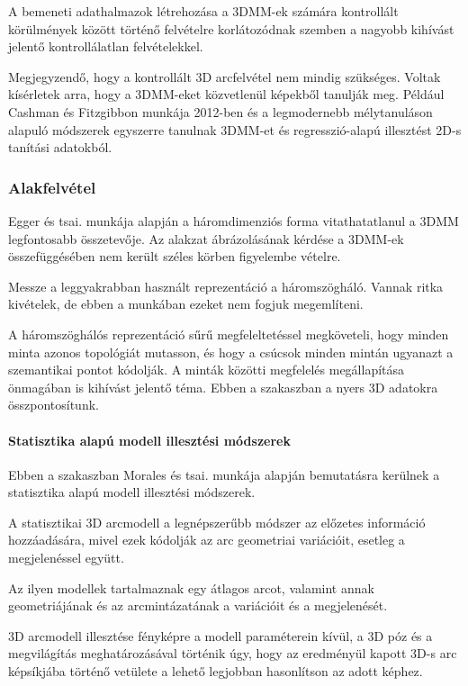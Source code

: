 \documentclass[12pt,a4]{article}
\begin{document}
        A bemeneti adathalmazok létrehozása a 3DMM-ek számára kontrollált körülmények között történő felvételre korlátozódnak szemben a nagyobb kihívást jelentő kontrollálatlan felvételekkel.
	 
        Megjegyzendő, hogy a kontrollált 3D arcfelvétel nem mindig szükséges. Voltak kísérletek arra, hogy a 3DMM-eket közvetlenül képekből tanulják meg. Például Cashman és Fitzgibbon \cite{dolphins} munkája 2012-ben és a legmodernebb mélytanuláson alapuló módszerek egyszerre tanulnak 3DMM-et és regresszió-alapú illesztést 2D-s tanítási adatokból.
	 
	 \subsubsection{Alakfelvétel}
    	 Egger és tsai. \cite{3dmm} munkája alapján a háromdimenziós forma vitathatatlanul a 3DMM legfontosabb összetevője. Az alakzat ábrázolásának kérdése
    	 a 3DMM-ek összefüggésében nem került széles körben figyelembe vételre.
    	 
	   Messze a
	   leggyakrabban használt reprezentáció a háromszögháló. Vannak ritka kivételek, de ebben a munkában ezeket nem fogjuk megemlíteni.
	 
    A háromszöghálós reprezentáció sűrű megfeleltetéssel megköveteli, hogy minden minta azonos topológiát mutasson, és hogy a csúcsok minden mintán ugyanazt a szemantikai pontot kódolják. A minták közötti megfelelés megállapítása önmagában is kihívást jelentő téma. Ebben a szakaszban a nyers 3D adatokra összpontosítunk.
	
	
	\paragraph{Statisztika alapú modell illesztési módszerek}
    Ebben a szakaszban Morales és tsai. \cite{survey} munkája alapján bemutatásra kerülnek a statisztika alapú modell illesztési módszerek.
	
    A statisztikai 3D arcmodell a legnépszerűbb módszer az előzetes információ hozzáadására, mivel ezek kódolják az arc geometriai variációit, esetleg a megjelenéssel együtt.
	
	Az ilyen modellek tartalmaznak egy átlagos arcot, valamint annak geometriájának és az arcmintázatának a variációit és a megjelenését.
	 
	  3D arcmodell illesztése fényképre
	a modell paraméterein kívül,
	a 3D póz és a megvilágítás meghatározásával történik úgy, hogy
	az eredményül kapott 3D-s arc képsíkjába történő vetülete
	a lehető legjobban hasonlítson az adott képhez.
	
\end{document}
